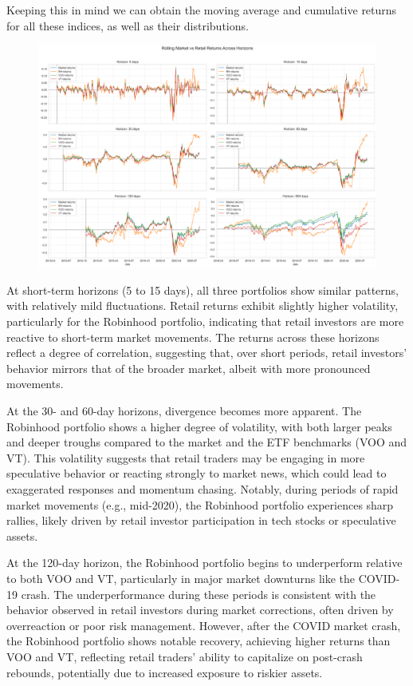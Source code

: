 Keeping this in mind we can obtain the moving average and cumulative returns for all these indices, as well as their distributions.

\begin{figure}[h!]
    \centering
    \includegraphics[width=1\linewidth]
    {../images/returns_comparison.png}
    \label{fig:enter-label}
\end{figure}

At short-term horizons (5 to 15 days), all three portfolios show similar patterns, with relatively mild fluctuations. Retail returns exhibit slightly higher volatility, particularly for the Robinhood portfolio, indicating that retail investors are more reactive to short-term market movements. The returns across these horizons reflect a degree of correlation, suggesting that, over short periods, retail investors' behavior mirrors that of the broader market, albeit with more pronounced movements.

At the 30- and 60-day horizons, divergence becomes more apparent. The Robinhood portfolio shows a higher degree of volatility, with both larger peaks and deeper troughs compared to the market and the ETF benchmarks (VOO and VT). This volatility suggests that retail traders may be engaging in more speculative behavior or reacting strongly to market news, which could lead to exaggerated responses and momentum chasing. Notably, during periods of rapid market movements (e.g., mid-2020), the Robinhood portfolio experiences sharp rallies, likely driven by retail investor participation in tech stocks or speculative assets.

At the 120-day horizon, the Robinhood portfolio begins to underperform relative to both VOO and VT, particularly in major market downturns like the COVID-19 crash. The underperformance during these periods is consistent with the behavior observed in retail investors during market corrections, often driven by overreaction or poor risk management. However, after the COVID market crash, the Robinhood portfolio shows notable recovery, achieving higher returns than VOO and VT, reflecting retail traders' ability to capitalize on post-crash rebounds, potentially due to increased exposure to riskier assets.

